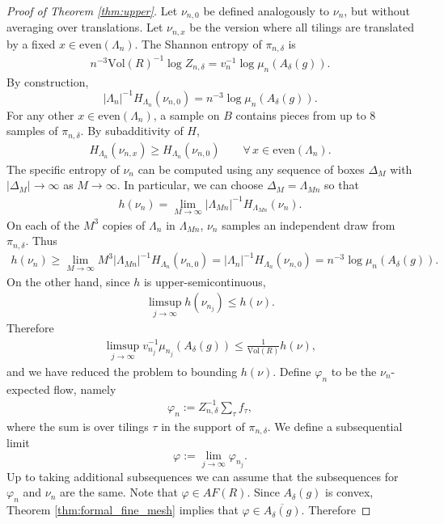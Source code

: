 \documentclass[11pt]{article}
\theoremstyle{remark}
\theoremstyle{definition}
\newcommand{\Vol}{\text{Vol}}
\begin{document}
\begin{proof}[Proof of Theorem \ref{thm:upper}]
Let $\nu_{n,0}$ be defined analogously to $\nu_n$, but without averaging over translations. Let $\nu_{n,x}$ be the version where all tilings are translated by a fixed $x\in \text{even}(\Lambda_n)$. The Shannon entropy of $\pi_{n,\delta}$ is 
\begin{align*}
 n^{-3}\text{Vol}(R)^{-1} \log Z_{n,\delta} = v_n^{-1} \log \mu_n(A_\delta(g)).
\end{align*}
By construction, 
$$|\Lambda_{n}|^{-1} H_{\Lambda_{n}}(\nu_{n,0})=  n^{-3} \log \mu_n(A_\delta(g)).$$ 
For any other $x\in \text{even}(\Lambda_n)$, a sample on $B$ contains pieces from up to $8$ samples of $\pi_{n,\delta}$. By subadditivity of $H$,
\begin{align*}
    H_{\Lambda_n}(\nu_{n,x})\geq H_{\Lambda_n}(\nu_{n,0}) \qquad \forall \, x\in \text{even}(\Lambda_n).
\end{align*}
The specific entropy of $\nu_n$ can be computed using any sequence of boxes $\Delta_M$ with $|\Delta_M|\to\infty$ as $M\to \infty$. In particular, we can choose $\Delta_M =\Lambda_{Mn}$ so that
\begin{align*}
    h(\nu_n) = \lim_{M\to \infty} |\Lambda_{Mn}|^{-1}H_{\Lambda_{Mn}}(\nu_n).
\end{align*}
On each of the $M^3$ copies of $\Lambda_n$ in $\Lambda_{Mn}$, $\nu_n$ samples an independent draw from $\pi_{n,\delta}$. Thus 
\begin{align*}
    h(\nu_n) \geq \lim_{M\to \infty} M^3 |\Lambda_{Mn}|^{-1}H_{\Lambda_{n}}(\nu_{n,0}) = |\Lambda_n|^{-1} H_{\Lambda_n}(\nu_{n,0}) = n^{-3} \log \mu_n(A_\delta(g)). 
\end{align*}
On the other hand, since $h$ is upper-semicontinuous, 
\begin{align*}
    \limsup_{j\to \infty} h(\nu_{n_j}) \leq h(\nu).
\end{align*}
Therefore 
\begin{align*}
    \limsup_{j\to \infty} v_{n_j}^{-1}\mu_{n_j}(A_\delta(g)) \leq \frac{1}{\Vol(R)} h(\nu),
\end{align*}
and we have reduced the problem to bounding $h(\nu)$. Define $\varphi_n$ to be the $\nu_n$-expected flow, namely
\begin{align*}
    \varphi_n := Z_{n,\delta}^{-1} \sum_\tau f_\tau, 
\end{align*}
where the sum is over tilings $\tau$ in the support of $\pi_{n,\delta}$. We define a subsequential limit
$$\varphi:= \lim_{j\to \infty} \varphi_{n_j}.$$
Up to taking additional subsequences we can assume that the subsequences for $\varphi_n$ and $\nu_n$ are the same. Note that $\varphi\in AF(R)$. Since $A_\delta(g)$ is convex, Theorem \ref{thm:formal_fine_mesh} implies that $\varphi\in \overline{A_\delta(g)}$. Therefore 

\end{proof}
\end{document}
